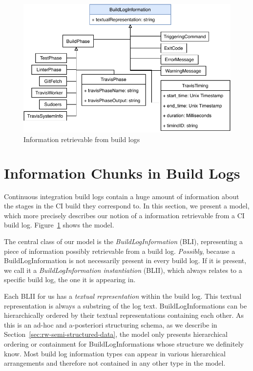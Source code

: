 \documentclass[\myrootdir/main.tex]{subfiles}
\begin{document}
\begin{figure}[htbp]
	\centering
	\includegraphics[width=\textwidth, clip]{img/build-log-information.pdf}
	\caption{Information retrievable from build logs}
	\label{fig:build-log-information}
\end{figure}
\section{Information Chunks in Build Logs}
\label{sec:bli}
Continuous integration build logs contain a huge amount of information about the stages in the CI build they correspond to.
In this section, we present a model, which more precisely describes our notion of a information retrievable from a CI build log.
Figure~\ref{fig:build-log-information} shows the model.

The central class of our model is the \emph{BuildLogInformation} (BLI), representing a piece of information possibly retrievable from a build log.
\emph{Possibly}, because a BuildLogInformation is not necessarily present in every build log.
If it is present, we call it a \emph{BuildLogInformation instantiation} (BLII), which always relates to a specific build log, the one it is appearing in.

Each BLII for us has a \emph{textual representation} within the build log.
This textual representation is always a substring of the log text.
BuildLogInformations can be hierarchically ordered by their textual representations containing each other.
As this is an ad-hoc and a-posteriori structuring schema, as we describe in Section~\ref{sec:rw-semi-structured-data}, the model only presents hierarchical ordering or containment for BuildLogInformations whose structure we definitely know.
Most build log information types can appear in various hierarchical arrangements and therefore not contained in any other type in the model.
\end{document}
